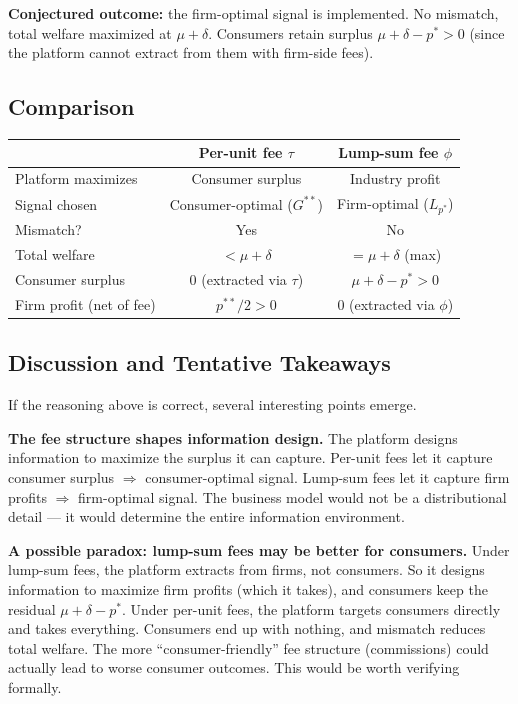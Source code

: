 \documentclass[12pt, a4paper]{article}
\begin{document}
\textbf{Conjectured outcome:} the firm-optimal signal is implemented. No mismatch, total welfare maximized at $\mu + \delta$. Consumers retain surplus $\mu + \delta - p^* > 0$ (since the platform cannot extract from them with firm-side fees).

\subsection{Comparison}

\begin{center}
\renewcommand{\arraystretch}{1.4}
\begin{tabular}{l c c}
\toprule
 & \textbf{Per-unit fee $\tau$} & \textbf{Lump-sum fee $\phi$} \\
\midrule
Platform maximizes & Consumer surplus & Industry profit \\
Signal chosen & Consumer-optimal ($G^{**}$) & Firm-optimal ($L_{p^*}$) \\
Mismatch? & Yes & No \\
Total welfare & $< \mu + \delta$ & $= \mu + \delta$ (max) \\
Consumer surplus & $0$ (extracted via $\tau$) & $\mu + \delta - p^* > 0$ \\
Firm profit (net of fee) & $p^{**}/2 > 0$ & $0$ (extracted via $\phi$) \\
\bottomrule
\end{tabular}
\end{center}

\subsection{Discussion and Tentative Takeaways}

If the reasoning above is correct, several interesting points emerge.

\textbf{The fee structure shapes information design.} The platform designs information to maximize the surplus it can capture. Per-unit fees let it capture consumer surplus $\Rightarrow$ consumer-optimal signal. Lump-sum fees let it capture firm profits $\Rightarrow$ firm-optimal signal. The business model would not be a distributional detail --- it would determine the entire information environment.

\textbf{A possible paradox: lump-sum fees may be better for consumers.} Under lump-sum fees, the platform extracts from firms, not consumers. So it designs information to maximize firm profits (which it takes), and consumers keep the residual $\mu + \delta - p^*$. Under per-unit fees, the platform targets consumers directly and takes everything. Consumers end up with nothing, and mismatch reduces total welfare. The more ``consumer-friendly'' fee structure (commissions) could actually lead to worse consumer outcomes. This would be worth verifying formally.
\end{document}
